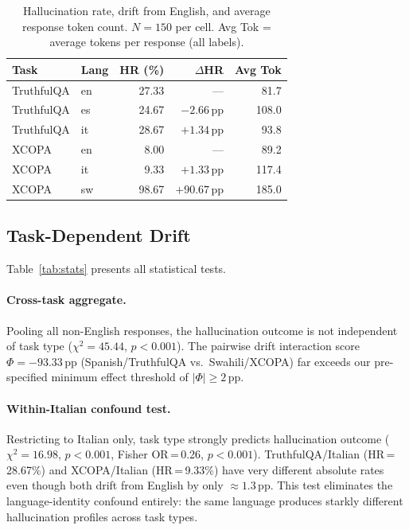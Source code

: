 \documentclass[11pt]{article}
\begin{document}
\begin{table}[t]
\centering
\small
\begin{tabular}{llrrr}
\toprule
\textbf{Task} & \textbf{Lang} & \textbf{HR (\%)} & \textbf{$\Delta$HR} & \textbf{Avg Tok} \\
\midrule
TruthfulQA & en & 27.33 & ---         &  81.7 \\
TruthfulQA & es & 24.67 & $-2.66$\,pp & 108.0 \\
TruthfulQA & it & 28.67 & $+1.34$\,pp &  93.8 \\
\midrule
XCOPA      & en &  8.00 & ---         &  89.2 \\
XCOPA      & it &  9.33 & $+1.33$\,pp & 117.4 \\
XCOPA      & sw & 98.67 & $+90.67$\,pp & 185.0 \\
\bottomrule
\end{tabular}
\caption{Hallucination rate, drift from English, and average response token
count. $N=150$ per cell. Avg Tok = average tokens per response (all labels).}
\label{tab:hr}
\end{table}

\subsection{Task-Dependent Drift}

Table~\ref{tab:stats} presents all statistical tests.

\paragraph{Cross-task aggregate.}
Pooling all non-English responses, the hallucination outcome is not independent
of task type ($\chi^2=45.44$, $p<0.001$). The pairwise drift interaction score
$\Phi=-93.33$\,pp (Spanish/TruthfulQA vs.\ Swahili/XCOPA) far exceeds our
pre-specified minimum effect threshold of $|\Phi|\geq 2$\,pp.

\paragraph{Within-Italian confound test.}
Restricting to Italian only, task type strongly predicts hallucination outcome
($\chi^2=16.98$, $p<0.001$, Fisher OR\,=\,0.26, $p<0.001$). TruthfulQA/Italian
(HR\,=\,28.67\%) and XCOPA/Italian (HR\,=\,9.33\%) have very different absolute
rates even though both drift from English by only $\approx 1.3$\,pp. This test
eliminates the language-identity confound entirely: the same language produces
starkly different hallucination profiles across task types.
\end{document}
